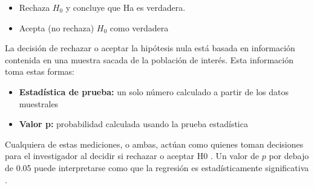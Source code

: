 \begin{itemize}
    \item Rechaza $H_0$ y concluye que Ha es verdadera.
    \item Acepta (no rechaza) $H_0$ como verdadera
\end{itemize}

La decisión de rechazar o aceptar la hipótesis nula está basada en información contenida en una muestra sacada de la población de interés. Esta información toma estas formas:

\begin{itemize}
    \item \textbf{Estadística de prueba:} un solo número calculado a partir de los datos muestrales
    \item \textbf{Valor p:} probabilidad calculada usando la prueba estadística
\end{itemize}

Cualquiera de estas mediciones, o ambas, actúan como quienes toman decisiones para el investigador al decidir si rechazar o aceptar H0 \cite{mendehall}. Un valor de $p$ por debajo de 0.05 puede interpretarse como que la regresión es estadísticamente significativa \cite{daroczi}.

